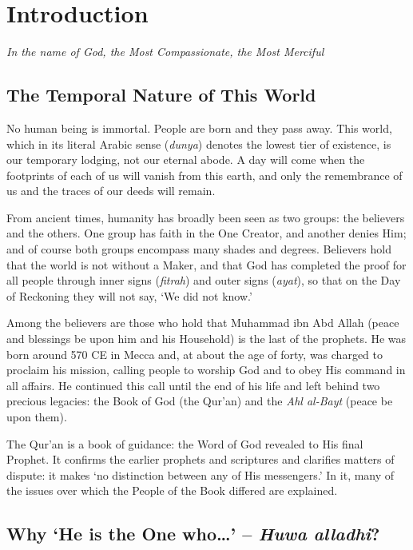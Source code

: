 \chapter{Introduction}

\begin{center}
\textit{In the name of God, the Most Compassionate, the Most Merciful}
\end{center}

\section{The Temporal Nature of This World}

No human being is immortal. People are born and they pass away. This world, which in its literal Arabic sense (\textit{dunya}) denotes the lowest tier of existence, is our temporary lodging, not our eternal abode. A day will come when the footprints of each of us will vanish from this earth, and only the remembrance of us and the traces of our deeds will remain.

From ancient times, humanity has broadly been seen as two groups: the believers and the others. One group has faith in the One Creator, and another denies Him; and of course both groups encompass many shades and degrees. Believers hold that the world is not without a Maker, and that God has completed the proof for all people through inner signs (\textit{fitrah}) and outer signs (\textit{ayat}), so that on the Day of Reckoning they will not say, `We did not know.'

Among the believers are those who hold that Muhammad ibn Abd Allah (peace and blessings be upon him and his Household) is the last of the prophets. He was born around 570 CE in Mecca and, at about the age of forty, was charged to proclaim his mission, calling people to worship God and to obey His command in all affairs. He continued this call until the end of his life and left behind two precious legacies: the Book of God (the Qur'an) and the \textit{Ahl al-Bayt} (peace be upon them).

The Qur'an is a book of guidance: the Word of God revealed to His final Prophet. It confirms the earlier prophets and scriptures and clarifies matters of dispute: it makes `no distinction between any of His messengers.' In it, many of the issues over which the People of the Book differed are explained.

\section{Why `He is the One who\ldots' -- \textit{Huwa alladhi}?}

